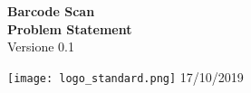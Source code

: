 \documentclass[20pt]{report}
\begin{document}
    \pagestyle{fancy}
    
    \vspace*{0.5cm}
    \flushright
    \textbf{Barcode Scan}\\
    \textbf{Problem Statement}\\
    Versione 0.1
    
    \vspace{1cm}
    \begin{center}
        \texttt{[image: logo\_standard.png]}
        \vfill
        17/10/2019
    \end{center}
\end{document}
